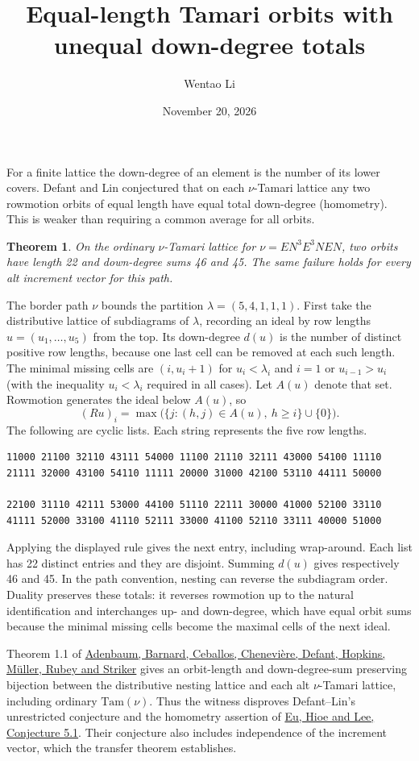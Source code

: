 \documentclass[11pt]{article}
\title{Equal-length Tamari orbits with unequal down-degree totals}
\author{Wentao Li}
\date{November 20, 2026}
\newtheorem{theorem}{Theorem}
\begin{document}
\maketitle
For a finite lattice the down-degree of an element is the number of its lower covers. Defant and Lin conjectured that on each $\nu$-Tamari lattice any two rowmotion orbits of equal length have equal total down-degree (homometry). This is weaker than requiring a common average for all orbits.
\begin{theorem}On the ordinary $\nu$-Tamari lattice for $\nu=EN^3E^3NEN$, two orbits have length 22 and down-degree sums 46 and 45. The same failure holds for every alt increment vector for this path.\end{theorem}
The border path $\nu$ bounds the partition $\lambda=(5,4,1,1,1)$. First take the distributive lattice of subdiagrams of $\lambda$, recording an ideal by row lengths $u=(u_1,\ldots,u_5)$ from the top. Its down-degree $d(u)$ is the number of distinct positive row lengths, because one last cell can be removed at each such length. The minimal missing cells are $(i,u_i+1)$ for $u_i<\lambda_i$ and $i=1$ or $u_{i-1}>u_i$ (with the inequality $u_i<\lambda_i$ required in all cases). Let $A(u)$ denote that set. Rowmotion generates the ideal below $A(u)$, so
\[
 (Ru)_i=\max\big(\{j:(h,j)\in A(u),\ h\ge i\}\cup\{0\}\big).
\]
The following are cyclic lists. Each string represents the five row lengths.
\begin{verbatim}
11000 21100 32110 43111 54000 11100 21110 32111 43000 54100 11110
21111 32000 43100 54110 11111 20000 31000 42100 53110 44111 50000

22100 31110 42111 53000 44100 51110 22111 30000 41000 52100 33110
41111 52000 33100 41110 52111 33000 41100 52110 33111 40000 51000
\end{verbatim}
Applying the displayed rule gives the next entry, including wrap-around. Each list has 22 distinct entries and they are disjoint. Summing $d(u)$ gives respectively 46 and 45. In the path convention, nesting can reverse the subdiagram order. Duality preserves these totals: it reverses rowmotion up to the natural identification and interchanges up- and down-degree, which have equal orbit sums because the minimal missing cells become the maximal cells of the next ideal.

Theorem 1.1 of \href{https://arxiv.org/abs/2609.12983}{Adenbaum, Barnard, Ceballos, Chenevière, Defant, Hopkins, Müller, Rubey and Striker} gives an orbit-length and down-degree-sum preserving bijection between the distributive nesting lattice and each alt $\nu$-Tamari lattice, including ordinary $\mathrm{Tam}(\nu)$. Thus the witness disproves Defant--Lin's unrestricted conjecture and the homometry assertion of \href{https://arxiv.org/abs/2605.29431}{Eu, Hioe and Lee, Conjecture 5.1}. Their conjecture also includes independence of the increment vector, which the transfer theorem establishes.
\end{document}
